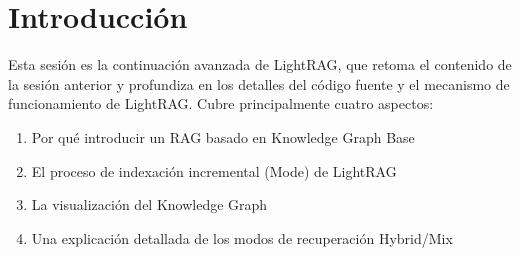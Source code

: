 \section{Introducción}

Esta sesión es la continuación avanzada de LightRAG, que retoma el contenido de la sesión anterior y profundiza en los detalles del código fuente y el mecanismo de funcionamiento de LightRAG. Cubre principalmente cuatro aspectos:

\begin{enumerate}
    \item Por qué introducir un RAG basado en Knowledge Graph Base
    \item El proceso de indexación incremental (Mode) de LightRAG
    \item La visualización del Knowledge Graph
    \item Una explicación detallada de los modos de recuperación Hybrid/Mix
\end{enumerate}



